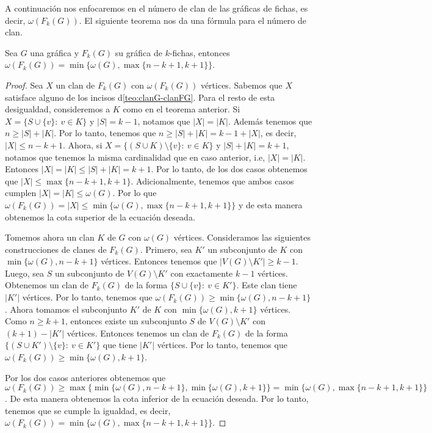A continuaci\'on nos enfocaremos en el n\'umero de clan de las gr\'aficas de
fichas, es decir, $\omega(F_k(G))$. El siguiente teorema nos da una f\'ormula
para el n\'umero de clan.
            
\begin{teorema}
\label{teo:clan-max}
    Sea $G$ una gr\'afica y $F_k(G)$ su gr\'afica de $k$-fichas, entonces
    $\omega(F_k(G))= \min \{\omega(G), \max \{n-k+1,k+1\}\}$.
\end{teorema}

\begin{proof}
    Sea $X$ un clan de $F_k(G)$ con $\omega(F_k(G))$ v\'ertices. Sabemos que $X$
    satisface alguno de los incisos d\cref{teo:clanG-clanFG}. Para el resto de
    esta desigualdad, consideremos a $K$ como en el teorema anterior.   Si $X =
    \{S \cup \{v\} \colon\ v \in K\}$ y $|S| = k-1$, notamos que $|X| = |K|$.
    Adem\'as tenemos que $n \geq |S| + |K|$. Por lo tanto, tenemos que $n \geq
    |S| + |K| = k-1 + |X|$, es decir, $|X| \leq n-k+1$. Ahora, si $X = \{(S\cup
    K) \setminus \{v\} \colon\ v \in K \}$ y $|S| + |K| = k+1$, notamos que
    tenemos la misma cardinalidad que en caso anterior, i.e, $|X| =|K|$.
    Entonces $|X| = |K| \leq |S| + |K| = k+1$. Por lo tanto, de los dos casos
    obtenemos que $|X| \leq \max\{n-k+1, k+1\}$. Adicionalmente, tenemos que
    ambos casos cumplen $|X| = |K| \leq \omega(G)$. Por lo que $\omega(F_k(G)) =
    |X| \leq \min \{\omega(G), \max \{n-k+1, k+1\}\}$ y de esta manera obtenemos
    la cota superior de la ecuaci\'on deseada.

    Tomemos ahora un clan $K$ de $G$ con $\omega(G)$ v\'ertices. Consideramos
    las siguientes construcciones de clanes de $F_k(G)$. Primero, sea $K'$ un
    subconjunto de $K$ con $\min\{\omega(G),n-k+1\}$ v\'ertices. Entonces
    tenemos que $|V(G) \setminus K'| \geq k-1$. Luego, sea $S$ un subconjunto de
    $V(G) \setminus K'$ con exactamente $k-1$ v\'ertices. Obtenemos un clan de
    $F_k(G)$ de la forma $\{ S \cup \{v\} \colon\ v \in K'\}$. Este clan tiene
    $|K'|$ v\'ertices. Por lo tanto, tenemos que $\omega(F_k(G)) \geq \min
    \{\omega(G), n-k+1\}$. Ahora tomamos el subconjunto $K'$ de $K$ con $\min \{
    \omega(G), k+1\}$ v\'ertices. Como $n \geq k+1$, entonces existe un
    subconjunto $S$ de $V(G) \setminus K'$ con $(k+1)-|K'|$ v\'ertices. Entonces
    tenemos un clan de $F_k(G)$ de la forma $\{ (S \cup K') \setminus \{v\}
    \colon\ v \in K'\}$ que tiene $|K'|$ v\'ertices. Por lo tanto, tenemos que
    $\omega(F_k(G)) \geq \min \{\omega(G), k+1\}$.

    Por los dos casos anteriores obtenemos que $\omega(F_k(G)) \geq \max \{\min
    \{\omega(G), n-k+1\}, \min \{\omega(G), k+1 \}\} = \min \{\omega(G), \max
    \{n-k+1,k+1\}\}$. De esta manera obtenemos la cota inferior de la ecuaci\'on
    deseada. Por lo tanto, tenemos que se cumple la igualdad, es decir,
    $\omega(F_k(G))= \min \{\omega(G), \max \{n-k+1,k+1\}\}$.
\end{proof}


